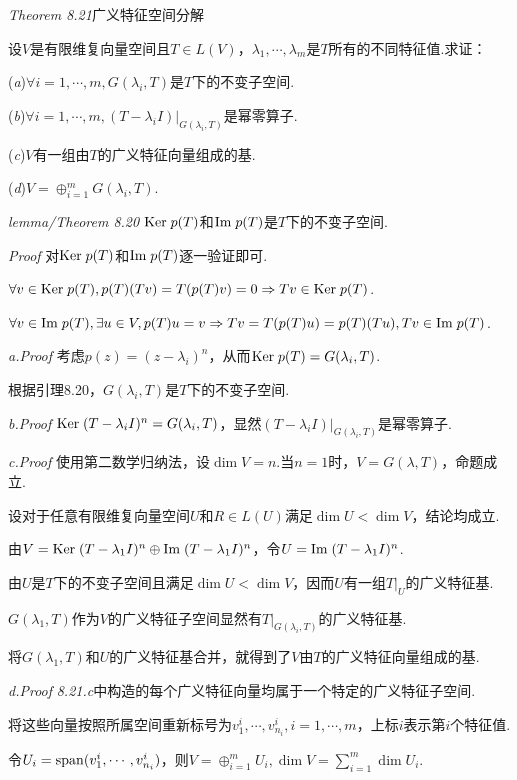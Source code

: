 \textit{Theorem 8.21}{\kaishu 广义特征空间分解}

设\(V\)是有限维复向量空间且\(T \in L(V)\)，\(\lambda_1,\cdots,\lambda_m\)是\(T\)所有的不同特征值.求证：

(\textit{a})\(\forall i=1,\cdots,m,G(\lambda_i,T)\)是\(T\)下的不变子空间.

(\textit{b})\(\forall i=1,\cdots,m,(T-\lambda_i I)|_{G(\lambda_i,T)}\)是幂零算子.

(\textit{c})\(V\)有一组由\(T\)的广义特征向量组成的基.

(\textit{d})\(V=\oplus_{i=1}^m G(\lambda_i,T)\).

\textit{lemma/Theorem 8.20}
\(\mathrm{Ker \;} p(T)\)和\(\mathrm{Im \;} p(T)\)是\(T\)下的不变子空间.

\textit{Proof}
对\(\mathrm{Ker \;} p(T)\)和\(\mathrm{Im \;} p(T)\)逐一验证即可.

\(\forall v \in \mathrm{Ker \;} p(T),p(T)(Tv)=T(p(T)v)=0 \Rightarrow Tv \in \mathrm{Ker \;} p(T)\).

\(\forall v \in \mathrm{Im \;} p(T),\exists u \in V,p(T)u=v \Rightarrow Tv=T(p(T)u)=p(T)(Tu),Tv \in \mathrm{Im \;} p(T)\).

\textit{a.Proof}
考虑\(p(z)=(z-\lambda_i)^n\)，从而\(\mathrm{Ker \;} p(T)=G(\lambda_i,T)\).

根据引理8.20，\(G(\lambda_i,T)\)是\(T\)下的不变子空间.

\textit{b.Proof}
\(\mathrm{Ker \;} (T-\lambda_i I)^n=G(\lambda_i,T)\)，显然\((T-\lambda_i I)|_{G(\lambda_i,T)}\)是幂零算子.

\textit{c.Proof}
使用第二数学归纳法，设\(\dim V=n\).当\(n=1\)时，\(V=G(\lambda,T)\)，命题成立.

设对于任意有限维复向量空间\(U\)和\(R \in L(U)\)满足\(\dim U<\dim V\)，结论均成立.

由\(V=\mathrm{Ker \;} (T-\lambda_1 I)^n \oplus \mathrm{Im \;} (T-\lambda_1 I)^n\)，令\(U=\mathrm{Im \;} (T-\lambda_1 I)^n\).

由\(U\)是\(T\)下的不变子空间且满足\(\dim U<\dim V\)，因而\(U\)有一组\(T|_U\)的广义特征基.

\(G(\lambda_1,T)\)作为\(V\)的广义特征子空间显然有\(T|_{G(\lambda_i,T)}\)的广义特征基.

将\(G(\lambda_1,T)\)和\(U\)的广义特征基合并，就得到了\(V\)由\(T\)的广义特征向量组成的基.

\textit{d.Proof}
\textit{8.21.c}中构造的每个广义特征向量均属于一个特定的广义特征子空间.

将这些向量按照所属空间重新标号为\(v_1^i,\cdots,v_{n_i}^i,i=1,\cdots,m\)，上标\(i\)表示第\(i\)个特征值.

令\(U_i=\mathrm{span}(v_1^i,\cdots,v_{n_i}^i)\)，则\(V=\oplus_{i=1}^m U_i,\dim V=\sum_{i=1}^m \dim U_i\).

